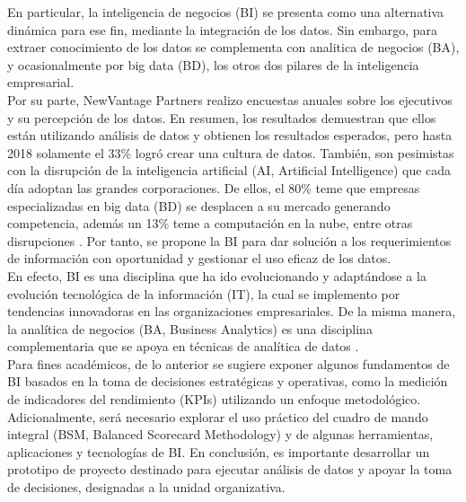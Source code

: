 \documentclass[11pt,titlepage]{report}
\begin{document}
En particular, la inteligencia de negocios (BI) se presenta como una alternativa dinámica para ese fin, mediante la integración de los datos. Sin embargo, para extraer conocimiento de los datos se complementa con analitica de negocios (BA), y ocasionalmente por big data (BD), los otros dos pilares de la inteligencia empresarial.\\

Por su parte, NewVantage Partners realizo encuestas anuales sobre los ejecutivos y su percepción de los datos. En resumen, los resultados demuestran que ellos están utilizando análisis de datos y obtienen los resultados esperados, pero hasta 2018 solamente el 33\% logró crear una cultura de datos. También, son pesimistas con la disrupción de la inteligencia artificial (AI, Artificial Intelligence) que cada día adoptan las grandes corporaciones. De ellos, el 80\% teme que empresas especializadas en big data (BD) se desplacen a su mercado generando competencia, además un 13\% teme a computación en la nube, entre otras disrupciones \cite{art06}. Por tanto, se propone la BI para dar solución a los requerimientos de información con oportunidad y gestionar el uso eficaz de los datos.\\

En efecto, BI es una disciplina que ha ido evolucionando y adaptándose a la evolución tecnológica de la información (IT), la cual se implemento por tendencias innovadoras en las organizaciones empresariales. De la misma manera, la analítica de negocios (BA, Business Analytics) es una disciplina complementaria que se apoya en técnicas de analítica de datos \cite{lib02}.\\

Para fines académicos, de lo anterior se sugiere exponer algunos fundamentos de BI basados en la toma de decisiones estratégicas y operativas, como la medición de indicadores del rendimiento (KPIs) utilizando un enfoque metodológico. Adicionalmente, será necesario explorar el uso práctico del cuadro de mando integral (BSM, Balanced Scorecard Methodology) y de algunas herramientas, aplicaciones y tecnologías de BI. En conclusión, es importante desarrollar un prototipo de proyecto destinado para ejecutar análisis de datos y apoyar la toma de decisiones, designadas a la unidad organizativa.


\newpage
\end{document}
